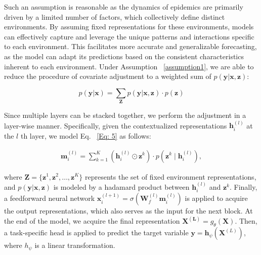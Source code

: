 Such an assumption is reasonable as the dynamics of epidemics are primarily driven by a limited number of factors, which collectively define distinct environments. By assuming fixed representations for these environments, models can effectively capture and leverage the unique patterns and interactions specific to each environment. This facilitates more accurate and generalizable forecasting, as the model can adapt its predictions based on the consistent characteristics inherent to each environment. Under Assumption ~\ref{assumption1}, we are able to reduce the procedure of covariate adjustment to a weighted sum of $p(\mathbf{y}|\mathbf{x},\mathbf{z})$:

\begin{equation}
\label{Eq: 5}
p(\mathbf{y} | \mathbf{x}) = \sum_{\mathbf{Z}} p(\mathbf{y} | \mathbf{x}, \mathbf{z}) \cdot p(\mathbf{z})   \tag{5}
\end{equation}

Since multiple layers can be stacked together, we perform the adjustment in a layer-wise manner. Specifically, given the contextualized representations $\mathbf{h}_i^{(l)}$ at the $l$ th layer, we model Eq. ~\ref{Eq: 5} as follows:

\begin{align}
\label{Eq: 6}
\mathbf{m}_i^{(l)}  = \sum_{k=1}^{K} (\mathbf{h}_i^{(l)} \odot \mathbf{z}^k) \cdot p(\mathbf{z}^k \mid \mathbf{h}_i^{(l)}), \tag{6}
\end{align}

where \( \mathbf{Z} = \{ \mathbf{z}^1, \mathbf{z}^2, \ldots, \mathbf{z}^K \} \) represents the set of fixed environment representations, and \( p(\mathbf{y} | \mathbf{x}, \mathbf{z}) \) is modeled by a hadamard product between $\mathbf{h}_i^{(l)}$ and $\mathbf{z}^k$. Finally, a feedforward neural network \( \mathbf{x}_i^{(l+1)} = \sigma(\mathbf{W}_f^{(l)} \mathbf{m}_i^{(l)}) \) is applied to acquire the output representations, which also serves as the input for the next block. At the end of the model, we acquire the final representation $\mathbf{X^{(L)}} = g_\theta(\mathbf{X})$. Then, a task-specific head is applied to predict the target variable $\mathbf{y}=\mathbf{h}_\psi(\mathbf{X}^{(L)})$, where $h_\psi$ is a linear transformation.





